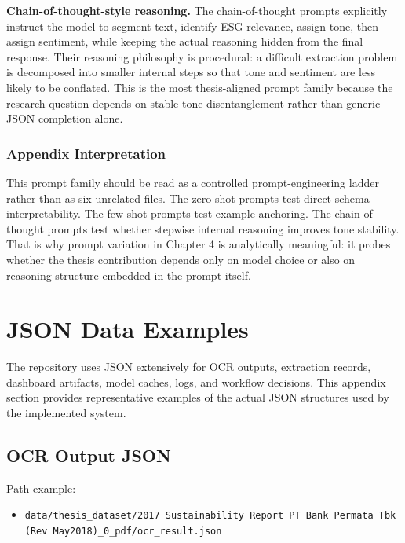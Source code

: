 \documentclass[english, online, cse, master]{dithesis}
\providecommand{\tightlist}{\setlength{\itemsep}{0pt}\setlength{\parskip}{0pt}}
\begin{document}
\textbf{Chain-of-thought-style reasoning.} The chain-of-thought prompts explicitly instruct the model to segment text, identify ESG relevance, assign tone, then assign sentiment, while keeping the actual reasoning hidden from the final response. Their reasoning philosophy is procedural: a difficult extraction problem is decomposed into smaller internal steps so that tone and sentiment are less likely to be conflated. This is the most thesis-aligned prompt family because the research question depends on stable tone disentanglement rather than generic JSON completion alone.

\subsubsection{Appendix Interpretation}\label{appendix-interpretation}

This prompt family should be read as a controlled prompt-engineering ladder rather than as six unrelated files. The zero-shot prompts test direct schema interpretability. The few-shot prompts test example anchoring. The chain-of-thought prompts test whether stepwise internal reasoning improves tone stability. That is why prompt variation in Chapter 4 is analytically meaningful: it probes whether the thesis contribution depends only on model choice or also on reasoning structure embedded in the prompt itself.

\section{JSON Data Examples}\label{json-data-examples}

The repository uses JSON extensively for OCR outputs, extraction records, dashboard artifacts, model caches, logs, and workflow decisions. This appendix section provides representative examples of the actual JSON structures used by the implemented system.

\subsection{OCR Output JSON}\label{ocr-output-json}

Path example:

\begin{itemize}
\tightlist
\item
  \texttt{data/thesis\_dataset/2017\ Sustainability\ Report\ PT\ Bank\ Permata\ Tbk\ (Rev\ May2018)\_0\_pdf/ocr\_result.json}
\end{itemize}
\end{document}
